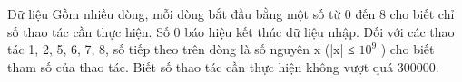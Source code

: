Dữ liệu  
Gồm nhiều dòng, mỗi dòng bắt đầu bằng một số từ 0 đến 8 cho biết chỉ số thao tác cần thực hiện. Số 0 báo hiệu kết thúc dữ liệu nhập. Đối với các thao tác 1, 2, 5, 6, 7, 8, số tiếp theo trên dòng là số nguyên x (|x| ≤ $10^{9}$   ) cho biết tham số của thao tác. Biết số thao tác cần thực hiện không vượt quá 300000.